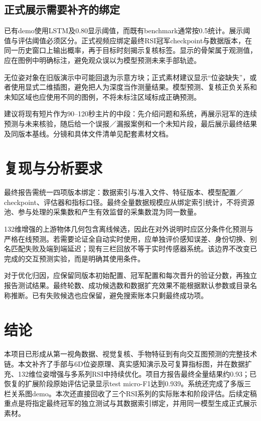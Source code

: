 \documentclass[10pt,twocolumn,letterpaper]{article}
\begin{document}
\subsection{正式展示需要补齐的绑定}
已有demo使用LSTM及0.80显示阈值，而既有benchmark通常按0.5统计。展示阈值与评估阈值必须区分。正式视频应绑定最终RSI冠军checkpoint与数据版本，在同一历史窗口上输出概率，再于目标时刻揭示复核标签。显示的骨架属于观测值，应在图例中明确标注，避免观众误以为模型预测未来手部轨迹。

无位姿对象在旧版演示中可能回退为示意方块；正式素材建议显示“位姿缺失”，或者使用显式二维插图，避免把人为深度当作测量结果。模型预测、复核正负关系和未知区域也应使用不同的图例，不将未标注区域标成正确预测。

建议将现有短片作为90--120秒主片的中段：先介绍问题和系统，再展示冠军的连续预测与未来核验，随后给一个误报／漏报案例和一个未知片段，最后展示最终结果及同版本基线。分镜和具体文件清单见配套素材文档。

\section{复现与分析要求}
最终报告需统一四项版本绑定：数据索引与准入文件、特征版本、模型配置／checkpoint、评估器和指标口径。最终全量数据规模应从绑定索引统计，不将资源池、参与处理的采集数和产生有效监督的采集数混为同一数量。

132维增强的上游物体几何包含离线候选，因此在对外说明时应区分条件化预测与严格在线预测。若需要论证全自动实时使用，应单独评价感知误差、身份切换、别名匹配失败及端到端延迟；现有三栏回放不等于实时传感器系统。该边界不改变已完成的交互预测实验，而是明确其使用条件。

对于优化归因，应保留同版本初始配置、冠军配置和每次晋升的验证分数，再独立报告测试结果。最终轮数、成功候选数和数据扩充效果不能根据默认参数或目录名称推断。已有失败候选也应保留，避免搜索账本只剩最终成功项。

\section{结论}
本项目已形成从第一视角数据、视觉复核、手物特征到有向交互图预测的完整技术链。本文补齐了手部与6D位姿原理、真实感知演示及可复算指标图，并在数据扩充、132维位姿增强与多系列RSI中持续优化。项目方报告最终全量结果约0.93；已恢复的扩展阶段原始评估记录显示test micro-F1达到0.939。系统还完成了多版三栏关系图demo。本次还直接回收了三个RSI系列的实际账本和阶段评估。后续定稿重点是将指定最终冠军的独立测试与其数据索引绑定，并用同一模型生成正式展示素材。

\balance{\small}
\clearpage\appendix\balance
\end{document}
